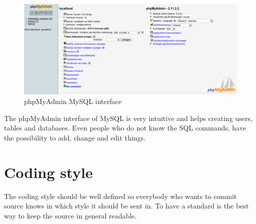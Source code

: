  \begin{figure}[h]
   \centering
   \includegraphics[scale=0.45]{images/ScreenShot-phpMyAdmin.png}
   \caption{phpMyAdmin MySQL interface}
   \label{fg:implementation:phpMyAdminConfig:Interface}
  \end{figure}

  The phpMyAdmin interface of MySQL is very intuitive and helps creating users, tables and databases. Even people who do not know the SQL commands, have the possibility to add, change and edit things.


 \section{Coding style}
  The coding style should be well defined so everybody who wants to commit source knows in which style it should be sent in. To have a standard is the best way to keep the source in general readable.

